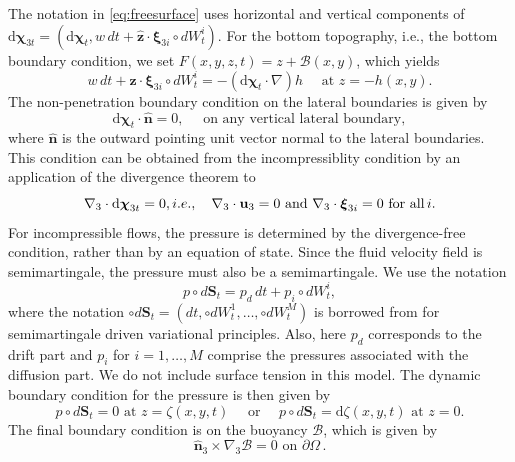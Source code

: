 \documentclass[11pt, oneside]{article}   	%
\numberwithin{equation}{section}
\theoremstyle{plain}
\theoremstyle{definition}
\theoremstyle{remark}
\newcommand{\<}{\langle}
\renewcommand{\>}{\rangle}
\def\rmd{{\mathrm{d}}}
\begin{document}
The notation in \eqref{eq:freesurface} uses horizontal and vertical components of ${\rmd}\boldsymbol\chi_{3t}=({\rmd}\boldsymbol \chi_t,w\,dt + \hat{\mathbf{z}}\cdot\boldsymbol \xi_{3i}\circ dW_t^i)$. For the bottom topography, i.e., the bottom boundary condition, we set $F(x,y,z,t) = z + \mathscr{B}(x,y)$, which yields
\begin{equation}\label{eq:bathymetry}
w\,dt + \hat{\mathbf{z}}\cdot\boldsymbol \xi_{3i}\circ dW_t^i = -({\rmd}\boldsymbol \chi_t\cdot\nabla)h \quad \text{ at } z=-h(x,y).
\end{equation}
The non-penetration boundary condition on the lateral boundaries is given by
\begin{equation}
{\rmd}\boldsymbol \chi_t\cdot\hat{\mathbf{n}} = 0, \quad \text{ on any vertical lateral boundary},
\end{equation}
where $\hat{\mathbf{n}}$ is the outward pointing unit vector normal to the lateral boundaries. This condition can be obtained from the incompressiblity condition by an application of the divergence theorem to
\begin{equation}
\nabla_3\cdot{\rmd}\boldsymbol \chi_{3t} = 0, i.e., \quad \nabla_3\cdot\mathbf{u}_3 = 0 \text{ and } \nabla_3\cdot\boldsymbol \xi_{3i}=0  \hbox{ for all}\, i.
\end{equation}
For incompressible flows, the pressure is determined by the divergence-free condition, rather than by an equation of state. Since the fluid velocity field is semimartingale, the pressure must also be a semimartingale. We use the notation
 
\begin{equation}
p\circ d\mathbf{S}_t = p_d\,dt + p_i\circ dW_t^i,
\end{equation}
where the notation $\circ d\mathbf{S}_t=(dt,\circ dW_t^1,\hdots,\circ dW_t^M)$ is borrowed from \cite{street2021semi} for semimartingale driven variational principles. Also, here $p_d$ corresponds to the drift part and $p_i$ for $i=1,\hdots,M$ comprise the pressures associated with the diffusion part. We do not include surface tension in this model. The dynamic boundary condition for the pressure is then given by
\begin{equation}
p\circ d\mathbf{S}_t = 0 \text{ at } z=\zeta(x,y,t) \quad \text{ or } \quad p\circ d\mathbf{S}_t = {\rmd}\zeta(x,y,t) \text{ at } z=0.
\end{equation}
The final boundary condition is on the buoyancy $\mathscr{B}$, which is given by
\begin{equation}
\hat{\mathbf{n}}_3\times \nabla_3 \mathscr{B} = 0 \text{ on } \partial\Omega
\,.\end{equation}
\end{document}
